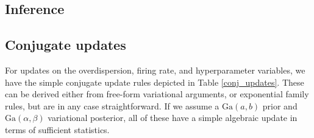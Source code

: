 \documentclass[12pt,a4paper]{article}
\begin{document}
\begin{flushleft}
\section{Inference}
\subsection{Conjugate updates}
For updates on the overdispersion, firing rate, and hyperparameter variables, we have the simple conjugate update rules depicted in Table \ref{conj_updates}. These can be derived either from free-form variational arguments, or exponential family rules, but are in any case straightforward\cite{Blei2006-oh}. If we assume a $\text{Ga}(a, b)$ prior and $\text{Ga}(\alpha, \beta)$ variational posterior, all of these have a simple algebraic update in terms of sufficient statistics.


\end{flushleft}
\end{document}
